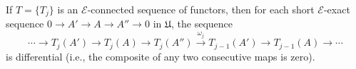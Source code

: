 If $T = \{T_j\}$ is an $\mathcal{E}$-connected sequence of functors, then for each short $\mathcal{E}$-exact sequence $0 \to A' \to A \to A'' \to 0$ in $\mathfrak{U}$, the sequence
$$\cdots \to T_j(A') \to T_j(A) \to T_j(A'') \xrightarrow{\omega_j} T_{j-1}(A') \to T_{j-1}(A) \to \cdots$$
is differential (i.e., the composite of any two consecutive maps is zero).